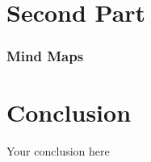 \documentclass{beamer}
\begin{document}
\section{Second Part}

\begin{frame}
  \frametitle{Mind Maps}
  \begin{center}
    \resizebox{0.8\textwidth}{!}{}
  \end{center}
\end{frame}

\section{Conclusion}
\label{sec:conclusion}

\begin{frame}
  \begin{center}
    \huge
    Your conclusion here
  \end{center}
\end{frame}
 
\end{document}
